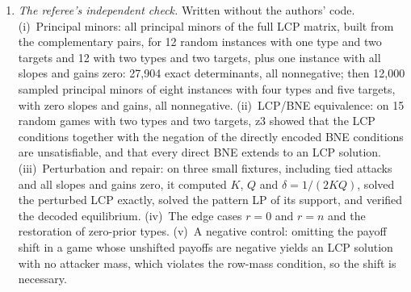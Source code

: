 \begin{itemize}[nosep]
\begin{enumerate}[nosep]
          $1{,}134$ and $663$ positive products, of which $494$ and $359$ involve the budget column). On four
          fixed games (a forced interior split over two tied targets; a game with all slopes and gains zero
          and tied attacks; a game with long binary data and a zero gain; and a game whose solution uses a
          cap and a zero coverage) it computes $K$, the denominator-cleared bound $Q$ and $\delta$, solves
          the perturbed LCP with z3, checks the box and the slack identities used in the proof of
          Theorem~\ref{app-dl:thm:main}, solves the pattern LP, and checks the decoded profile exactly (row
          masses, attacker best responses, budget, cutoff condition) together with the mixed-strategy
          decomposition of Lemma~\ref{app-dl:lem:decode}. It reports $1/\delta$ of $56$ to $958$ bits.
    \item \emph{The referee's independent check.} Written without the authors' code. (i)~Principal
          minors: all principal minors of the full LCP matrix, built from the complementary pairs, for 12
          random instances with one type and two targets and 12 with two types and two targets, plus one
          instance with all slopes and gains zero: 27{,}904 exact determinants, all nonnegative; then
          12{,}000 sampled principal minors of eight instances with four types and five targets, with zero
          slopes and gains, all nonnegative. (ii)~LCP/BNE equivalence: on 15 random games with two types
          and two targets, z3 showed that the LCP conditions together with the negation of the directly
          encoded BNE conditions are unsatisfiable, and that every direct BNE extends to an LCP solution.
          (iii)~Perturbation and repair: on three small fixtures, including tied attacks and all slopes and
          gains zero, it computed $K$, $Q$ and $\delta=1/(2KQ)$, solved the perturbed LCP exactly, solved
          the pattern LP of its support, and verified the decoded equilibrium. (iv)~The edge cases $r=0$
          and $r=n$ and the restoration of zero-prior types. (v)~A negative control: omitting the payoff
          shift in a game whose unshifted payoffs are negative yields an LCP solution with no attacker
          mass, which violates the row-mass condition, so the shift is necessary.
  \end{enumerate}
\end{itemize}

